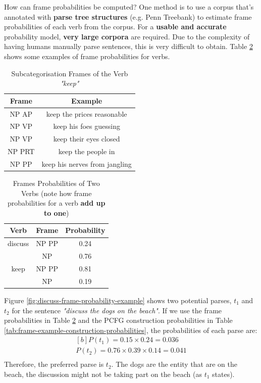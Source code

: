 \documentclass{article}
\begin{document}
How can frame probabilities be computed? One method is to use a corpus that's annotated with \textbf{parse tree structures} (e.g. Penn Treebank) to estimate frame probabilities of each verb from the corpus. For a \textbf{usable and accurate} probability model, \textbf{very large corpora} are required. Due to the complexity of having humans manually parse sentences, this is very difficult to obtain. Table \ref{tab:frame-probabilities} shows some examples of frame probabilities for verbs.

\begin{table}
	\centering
	\begin{tabular}{|c|c|}
		\hline
		\textbf{Frame} & \textbf{Example} \\
		\hline
		NP AP & keep the prices reasonable \\
		NP VP & keep his foes guessing \\
		NP VP & keep their eyes closed \\
		NP PRT & keep the people in \\
		NP PP & keep his nerves from jangling \\
		\hline
	\end{tabular}
	\caption{Subcategorisation Frames of the Verb \textit{"keep"}}
	\label{tab:frame-examples}
\end{table}

\begin{table}
	\centering
	\begin{tabular}{|c|c|c|}
		\hline
		\textbf{Verb} & \textbf{Frame} & \textbf{Probability} \\
		\hline
		discuss & NP PP & 0.24 \\
		& NP & 0.76 \\
		keep & NP PP & 0.81 \\
		& NP & 0.19 \\
		\hline
	\end{tabular}
	\caption{Frames Probabilities of Two Verbs (note how frame probabilities for a verb \textbf{add up to one})}
	\label{tab:frame-probabilities}
\end{table}

Figure \ref{fig:discuss-frame-probability-example} shows two potential parses, $t_1$ and $t_2$ for the sentence \textit{"discuss the dogs on the beach"}. If we use the frame probabilities in Table \ref{tab:frame-probabilities} and the PCFG construction probabilities in Table \ref{tab:frame-example-construction-probabilities}, the probabilities of each parse are:
\begin{equation}
\begin{aligned}[b]
	P(t_1) = 0.15 \times 0.24 = 0.036 \\
	P(t_2) = 0.76 \times 0.39 \times 0.14 = 0.041 \\
\end{aligned}
\end{equation}
Therefore, the preferred parse is $t_2$. The dogs are the entity that are on the beach, the discussion might not be taking part on the beach (as $t_1$ states).
\end{document}
